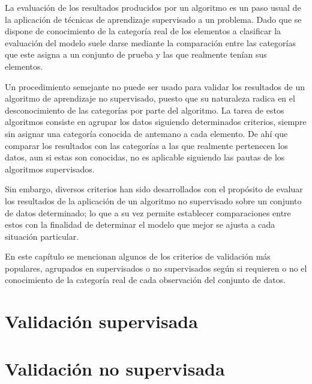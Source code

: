 La evaluación de los resultados producidos por un algoritmo es un paso usual de la aplicación de técnicas de aprendizaje supervisado a un problema.
Dado que se dispone de conocimiento de la categoría real de los elementos a clasificar la evaluación del modelo suele darse mediante la comparación entre las categorías que este asigna a un conjunto de prueba y las que realmente tenían sus elementos.

Un procedimiento semejante no puede ser usado para validar los resultados de un algoritmo de aprendizaje no supervisado, puesto que su naturaleza radica en el desconocimiento de las categorías por parte del algoritmo.
La tarea de estos algoritmos consiste en agrupar los datos siguiendo determinados criterios, siempre sin asignar una categoría conocida de antemano a cada elemento.
De ahí que comparar los resultados con las categorías a las que realmente pertenecen los datos, aun si estas son conocidas, no es aplicable siguiendo las pautas de los algoritmos supervisados.

Sin embargo, diversos criterios han sido desarrollados con el propósito de evaluar los resultados de la aplicación de un algoritmo no supervisado sobre un conjunto de datos determinado;
lo que a su vez permite establecer comparaciones entre estos con la finalidad de determinar el modelo que mejor se ajusta a cada situación particular.

En este capítulo se mencionan algunos de los criterios de validación más populares, agrupados en supervisados o no supervisados según si requieren o no el conocimiento de la categoría real de cada observación del conjunto de datos.

\section{Validación supervisada}\label{sec:validaciónSupervisada}


\section{Validación no supervisada}\label{sec:validaciónNoSupervisada}
